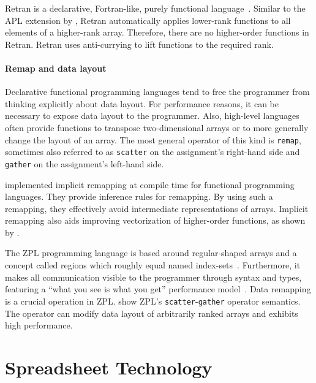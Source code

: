 \documentclass[a4paper]{article}
\begin{document}
Retran is a declarative, Fortran-like, purely functional
language~\cite{367042}. Similar to the APL extension by
\citet{Lowney:1981:CAI:567532.567533}, Retran automatically applies
lower-rank functions to all elements of a higher-rank
array. Therefore, there are no higher-order functions in
Retran. Retran uses anti-currying to lift functions to the required
rank.

\paragraph{Remap and data layout}

Declarative functional programming languages tend to free the
programmer from thinking explicitly about data layout. For performance
reasons, it can be necessary to expose data layout to the
programmer. Also, high-level languages often provide functions to
transpose two-dimensional arrays or to more generally change the
layout of an array. The most general operator of this kind is
\texttt{remap}, sometimes also referred to as \texttt{scatter} on the
assignment's right-hand side and \texttt{gather} on the assignment's
left-hand side.

\citet{Walinsky:1990:FPL:91556.91610} implemented implicit remapping
at compile time for functional programming languages. They provide
inference rules for remapping. By using such a remapping, they
effectively avoid intermediate representations of arrays. Implicit
remapping also aids improving vectorization of higher-order functions,
as shown by \citet{Sinkarovs:2013:SDL:2502323.2502332}.

The ZPL programming language is based around regular-shaped arrays and
a concept called regions which roughly equal named
index-sets~\cite{Chamberlain1999Regions}. Furthermore, it makes all
communication visible to the programmer through syntax and types,
featuring a ``what you see is what you get'' performance
model~\cite{Chamberlain1998ZPLs}. Data remapping is a crucial
operation in ZPL.\@ \citet{Deitz:2003:DIP:781498.781526} show ZPL's
\texttt{scatter}-\texttt{gather} operator semantics. The operator can
modify data layout of arbitrarily ranked arrays and exhibits high
performance.

\section{Spreadsheet Technology}
\label{sec:spreadsheet-end-user-dev}



\end{document}

